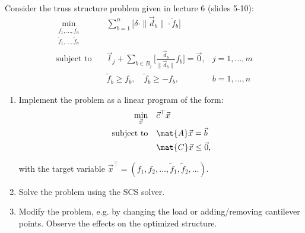 \begin{exercise}[subtitle={Notebook}]

Consider the truss structure problem given in lecture 6 (slides 5-10):
  \begin{equation*}
    \begin{aligned}
    \min_{\substack{f_1, \dots, f_n\\ \tilde f_1,\dots, \tilde f_n}} \quad & \sum_{b=1}^n \Big[ \delta \cdot  \|\vec d_b\| \cdot \tilde f_b  \Big]\\
    \text{subject to} \quad & 
    \vec l_j + \sum_{b \in B_j} \Big[ \frac{\vec d_b}{\|\vec d_b\|} f_b \Big] = \vec 0, & j = 1,\dots,m\\
    & \tilde f_b \geq f_b,\quad \tilde f_b \geq -f_b, & b = 1,\dots,n
    \end{aligned}
  \end{equation*}

\begin{enumerate}[label=\emph{\alph*)}]
\item Implement the problem as a linear program of the form:
\begin{align*}
 \min_{\vec{x}} \quad & \vec{c}^\top \vec{x}\\
 \text{subject to} \quad & \mat{A}\vec{x} = \vec{b}\\
 \quad & \mat{C}\vec{x} \leq \vec{0},
\end{align*}

with the target variable $\vec{x}^\top = (f_1, f_2, \dots, \tilde f_1, \tilde f_2, \dots)$. 
\item Solve the problem using the SCS solver.
\item Modify the problem, e.g. by changing the load or adding/removing cantilever points. Observe the effects on the optimized structure.
\end{enumerate}
\end{exercise}


